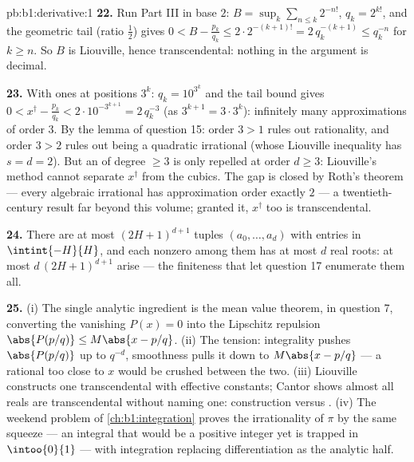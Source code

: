 \begin{solution}{pb:b1:derivative:1}
\textbf{22.} Run Part III in base $2$: $B = \sup_k \sum_{n\leq
k} 2^{-n!}$, $q_k = 2^{k!}$, and the geometric tail (ratio
$\frac12$) gives $0 < B - \frac{p_k}{q_k} \leq 2\cdot2^{-(k+1)!}
= 2\,q_k^{-(k+1)} \leq q_k^{-n}$ for $k \geq n$. So $B$ is
Liouville, hence transcendental: nothing in the argument is
decimal.

\textbf{23.} With ones at positions $3^k$: $q_k = 10^{3^k}$ and
the tail bound gives $0 < x^\dagger - \frac{p_k}{q_k} <
2\cdot10^{-3^{k+1}} = 2\,q_k^{-3}$ (as $3^{k+1} = 3\cdot3^k$):
infinitely many approximations of order $3$. By the lemma of
question 15: order $3 > 1$ rules out rationality, and order $3 >
2$ rules out being a quadratic irrational (whose Liouville
inequality has $s = d = 2$). But an  of degree
$\geq 3$ is only repelled at order $d \geq 3$: Liouville's
method cannot separate $x^\dagger$ from the cubics. The gap is
closed by Roth's theorem --- every algebraic irrational has
approximation order exactly $2$ --- a twentieth-century result
far beyond this volume; granted it, $x^\dagger$ too is
transcendental.

\textbf{24.} There are at most $(2H+1)^{d+1}$ tuples $(a_0,
\dots, a_d)$ with entries in $\intint{-H}{H}$, and each nonzero
 among them has at most $d$ real roots: at most
$d\,(2H+1)^{d+1}$  arise --- the finiteness
that let question 17 enumerate them all.

\textbf{25.} (i) The single analytic ingredient is the mean
value theorem, in question 7, converting the vanishing $P(x) =
0$ into the Lipschitz repulsion $\abs{P(p/q)} \leq M\abs{x -
p/q}$. (ii) The tension: integrality pushes $\abs{P(p/q)}$ up to
$q^{-d}$, smoothness pulls it down to $M\abs{x - p/q}$ --- a
rational too close to $x$ would be crushed between the two.
(iii) Liouville constructs one transcendental with effective
constants; Cantor shows almost all reals are transcendental
without naming one: construction versus . (iv) The
weekend problem of \cref{ch:b1:integration} proves the
irrationality of $\pi$ by the same squeeze --- an integral that
would be a positive integer yet is trapped in $\intoo{0}{1}$ ---
with integration replacing differentiation as the analytic
half.
\end{solution}
